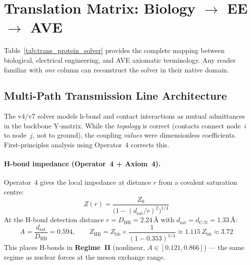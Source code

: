 \section{Translation Matrix: Biology $\to$ EE $\to$ AVE}
\label{sec:translation_matrix}

Table~\ref{tab:trans_protein_solver} provides the complete mapping between biological, electrical engineering, and AVE axiomatic terminology.  Any reader familiar with \emph{one} column can reconstruct the solver in their native domain.



\subsection{Multi-Path Transmission Line Architecture}
\label{sec:multipath_tl}

The v4/v7 solver models h-bond and contact interactions as mutual
admittances in the backbone Y-matrix.  While the \emph{topology} is
correct (contacts connect node~$i$ to node~$j$, not to ground), the
coupling \emph{values} were dimensionless coefficients.  First-principles
analysis using Operator~4 corrects this.

\paragraph{H-bond impedance (Operator~4 + Axiom~4).}
Operator~4 gives the local impedance at distance $r$ from a covalent
saturation centre:
\begin{equation}
    Z(r) = \frac{Z_0}{\bigl(1 - (d_\text{sat}/r)^2\bigr)^{1/4}}
    \label{eq:Z_op4}
\end{equation}
At the H-bond detection distance $r = D_\text{HB} = 2.24$\,\AA{}
with $d_\text{sat} = d_\text{C-N} = 1.33$\,\AA{}:
\begin{equation}
    A = \frac{d_\text{sat}}{D_\text{HB}} = 0.594, \qquad
    Z_\text{HB} = Z_\text{bb} \times
    \frac{1}{(1 - 0.353)^{1/4}} \approx 1.115\,Z_\text{bb}
    \approx 3.72
\end{equation}
This places H-bonds in \textbf{Regime~II} (nonlinear, $A \in [0.121, 0.866]$)
--- the same regime as nuclear forces at the meson exchange range.

